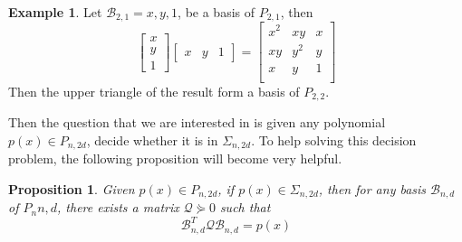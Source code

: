 \documentclass[12pt]{amsart}
\numberwithin{equation}{section}
\newtheorem{prop}[thm]{Proposition}
\theoremstyle{definition}
\newtheorem{example}[thm]{Example}
\numberwithin{thm}{section}
\begin{document}
\begin{example}
     Let $\mathcal{B}_{2, 1} = {x, y, 1}$, be a basis of $P_{2, 1}$, then 
     \begin{equation}
          \begin{bmatrix}
               x \\
               y \\
               1
          \end{bmatrix}
          \begin{bmatrix}
               x & y & 1
          \end{bmatrix}
          = \begin{bmatrix}
               x^2 & xy & x \\
               xy & y^2 & y \\
               x & y & 1 \\
          \end{bmatrix}
     \end{equation}
     Then the upper triangle of the result form a basis of $P_{2, 2}$.
\end{example}

Then the question that we are interested in is given any polynomial $p(x) \in P_{n,2d}$, decide whether it is in $\Sigma_{n, 2d}$. 
To help solving this decision problem, the following proposition will become very helpful.

\begin{prop}
     Given $p(x) \in P_{n, 2d}$, if $p(x) \in \Sigma_{n, 2d}$, then for any basis $\mathcal{B}_{n, d}$ of $P_n{n, d}$, there exists a matrix $ \mathcal{Q} \curlyeqsucc 0$ such that
     \begin{equation}
          \mathcal{B}_{n, d} ^ T \mathcal{Q} \mathcal{B}_{n, d} = p(x)
     \end{equation}
\end{prop}
\end{document}
